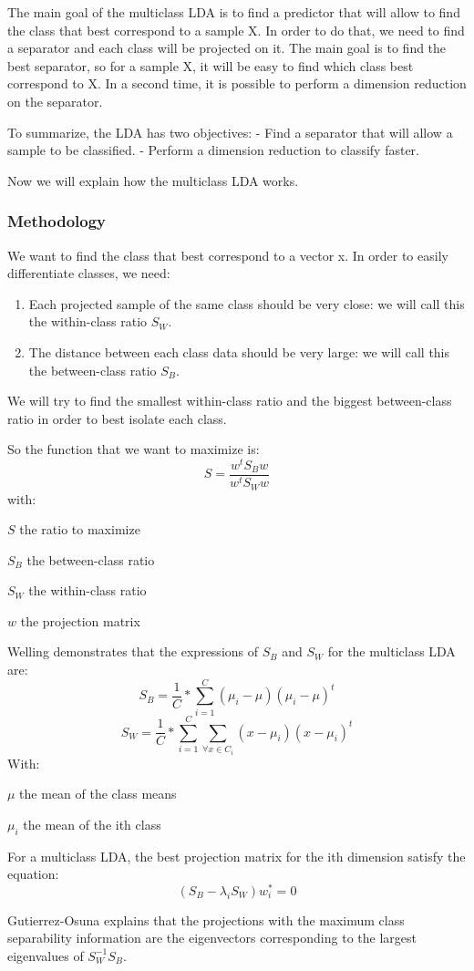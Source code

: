 The main goal of the multiclass LDA is to find a predictor that will allow to find the class that best correspond to a sample X.
In order to do that, we need to find a separator and each class will be projected on it.
The main goal is to find the best separator, so for a sample X, it will be easy to find which class
best correspond to X.
In a second time, it is possible to perform a dimension reduction on the separator.

To summarize, the LDA has two objectives:
- Find a separator that will allow a sample to be classified.
- Perform a dimension reduction to classify faster.

Now we will explain how the multiclass LDA works. 

\subsubsection{Methodology}

We want to find the class that best correspond to a vector x.
In order to easily differentiate classes, we need:

\begin{enumerate}
\item Each projected sample of the same class should be very close: we will call this the within-class ratio $S_W$.
\item The distance between each class data should be very large: we will call this the between-class ratio $S_B$.
\end{enumerate}

We will try to find the smallest within-class ratio and the biggest between-class ratio in order to best isolate each class.

So the function that we want to maximize is:
$$S = \frac{w^t S_B w}{w^t S_W w}$$
with:
\begin{itemize*}
  \item $S$ the ratio to maximize
  \item $S_B$ the between-class ratio
  \item $S_W$ the within-class ratio
  \item $w$ the projection matrix
\end{itemize*}

Welling\cite{welling} demonstrates that the expressions of $S_B$ and $S_W$ for the multiclass LDA are:
$$S_B = \frac{1}{C} * \sum\limits_{i = 1}^C (\mu_i - \mu)(\mu_i - \mu)^t$$
$$S_W = \frac{1}{C} * \sum\limits_{i = 1}^C \sum\limits_{\forall x \in C_i} (x - \mu_i)(x - \mu_i)^t$$
With:
\begin{itemize*}
  \item $\mu$ the mean of the class means
  \item $\mu_i$ the mean of the ith class
\end{itemize*}

For a multiclass LDA, the best projection matrix for the ith dimension satisfy the equation:
$$(S_B - \lambda_i S_W)w_{i}^* = 0$$

Gutierrez-Osuna\cite{gutierrez.osuna} explains that the projections with the maximum class separability information are the eigenvectors corresponding to the largest eigenvalues of $S_{W}^{-1} S_B$.

